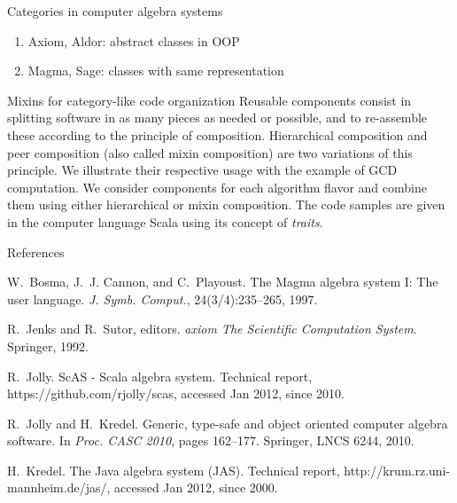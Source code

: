 \documentclass[final]{beamer}
\begin{document}
\begin{frame}[fragile]
\begin{columns}[t]
\begin{column}{.3\linewidth}
\begin{block}{\large Categories in computer algebra systems}
\begin{enumerate}
  \item Axiom, Aldor: abstract classes in OOP
        \cite{JenksSutor:1992, Watt:2003}
  \item Magma, Sage: classes with same representation
        \cite{BosmaCannonPlayoust:1997, Stein:2005}
  \end{enumerate}
  \end{block}
  \hfill
  \begin{block}{\large Mixins for category-like code organization}
\scriptsize
Reusable components \cite{Odersky:2005} consist in splitting software in
as many pieces as needed or possible, and to re-assemble these according
to the principle of composition. Hierarchical composition and peer
composition (also called mixin composition) are two variations of this
principle. We illustrate their respective usage with the example of GCD
computation. We consider components for each algorithm flavor and combine
them using either hierarchical or mixin composition. The code samples are
given in the computer language Scala using its concept of
{\em traits}.
  \end{block}
\hfill
  \begin{block}{\large References}
  \tiny %
\begin{thebibliography}{1}

\def\newblock{}
W.~Bosma, J.~J. Cannon, and C.~Playoust.
\newblock The {Magma} algebra system {I}: The user language.
\newblock {\em J. Symb. Comput.}, 24(3/4):235--265, 1997.

\def\newblock{}
R.~Jenks and R.~Sutor, editors.
\newblock {\em {axiom} The Scientific Computation System}.
\newblock Springer, 1992.

\def\newblock{}
R.~Jolly.
\newblock {ScAS} - {Scala} algebra system.
\newblock Technical report, \\ https://github.com/rjolly/scas, accessed Jan
  2012, since 2010.

\def\newblock{}
R.~Jolly and H.~Kredel.
\newblock Generic, type-safe and object oriented computer algebra software.
\newblock In {\em Proc. CASC 2010}, pages 162--177. Springer, LNCS 6244, 2010.

\def\newblock{}
H.~Kredel.
\newblock The {Java} algebra system ({JAS}).
\newblock Technical report, http://krum.\-rz.uni-mann\-he\-im.de/jas/, accessed Jan
  2012, since 2000.


\end{thebibliography}
\end{block}
\end{column}
\end{columns}
\end{frame}
\end{document}
